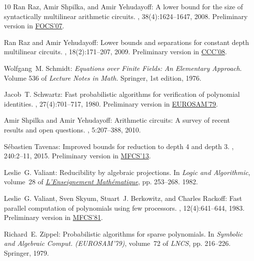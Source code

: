 \documentclass[11pt]{article}
\numberwithin{equation}{section}
\theoremstyle{definition}
\theoremstyle{plain}
\begin{document}
\begin{thebibliography}{10}
{\sc Ran Raz, Amir Shpilka, and Amir Yehudayoff}: A lower bound for the size of
  syntactically multilinear arithmetic circuits.
, 38(4):1624--1647, 2008.
\newblock Preliminary version in
  \href{https://ieeexplore.ieee.org/document/4389514}{FOCS'07}.
\newblock [\epfmtdoi{10.1137/070707932}]

{\sc Ran Raz and Amir Yehudayoff}: Lower bounds and separations for constant
  depth multilinear circuits.
, 18(2):171--207, 2009.
\newblock Preliminary version in
  \href{https://ieeexplore.ieee.org/document/4558817}{CCC'08}.
\newblock [\epfmtdoi{10.1007/s00037-009-0270-8}]

{\sc Wolfgang~M. Schmidt}: {\em Equations over Finite Fields: {A}n Elementary
  Approach}.
\newblock Volume 536 of {\em Lecture Notes in Math.}
\newblock Springer, 1st edition, 1976.

{\sc Jacob~T. Schwartz}: Fast probabilistic algorithms for verification of
  polynomial identities.
, 27(4):701--717, 1980.
\newblock Preliminary version in
  \href{https://link.springer.com/chapter/10.1007/3-540-09519-5_72}{EUROSAM'79}.
\newblock [\epfmtdoi{10.1145/322217.322225}]

{\sc Amir Shpilka and Amir Yehudayoff}: Arithmetic circuits: {A} survey of
  recent results and open questions.
, 5:207--388, 2010.
\newblock [\epfmtdoi{10.1561/0400000039}]

{\sc S{\'{e}}bastien Tavenas}: Improved bounds for reduction to depth 4 and
  depth 3.
, 240:2--11, 2015.
\newblock Preliminary version in
  \href{https://link.springer.com/chapter/10.1007/978-3-642-40313-2_71}{MFCS'13}.

{\sc Leslie~G. Valiant}: Reducibility by algebraic projections.
\newblock In {\em Logic and Algorithmic}, volume~28 of {\em
  \href{http://www.unige.ch/math/EnsMath/EM_en/}{L'Enseignement
  Math\'ematique}}, pp. 253--268. 1982.

{\sc Leslie~G. Valiant, Sven Skyum, Stuart~J. Berkowitz, and Charles Rackoff}:
  Fast parallel computation of polynomials using few processors.
, 12(4):641--644, 1983.
\newblock Preliminary version in
  \href{https://link.springer.com/chapter/10.1007/3-540-10856-4_79}{MFCS'81}.
\newblock [\epfmtdoi{10.1137/0212043}]

{\sc Richard~E. Zippel}: Probabilistic algorithms for sparse polynomials.
\newblock In {\em Symbolic and Algebraic Comput. (EUROSAM'79)}, volume~72 of
  {\em LNCS}, pp. 216--226. Springer, 1979.
\newblock [\epfmtdoi{10.1007/3-540-09519-5\_73}]

\end{thebibliography}
\end{document}
